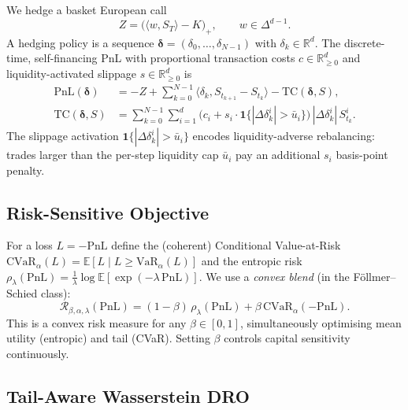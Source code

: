 \documentclass[11pt,a4paper]{article}
\begin{document}
We hedge a basket European call
\begin{equation}
Z = \big(\langle w, S_T \rangle - K\big)_+, \qquad w \in \Delta^{d-1}.
\end{equation}
A hedging policy is a sequence $\boldsymbol{\delta} = (\delta_0, \dots,
\delta_{N-1})$ with $\delta_k \in \mathbb{R}^d$. The discrete-time,
self-financing PnL with proportional transaction costs $c \in \mathbb{R}^d_{\geq 0}$
and liquidity-activated slippage $s \in \mathbb{R}^d_{\geq 0}$ is
\begin{align}
\mathrm{PnL}(\boldsymbol{\delta}) &= -Z + \sum_{k=0}^{N-1} \langle \delta_k,
  S_{t_{k+1}} - S_{t_k}\rangle - \mathrm{TC}(\boldsymbol{\delta}, S),\\
\mathrm{TC}(\boldsymbol{\delta}, S) &= \sum_{k=0}^{N-1}\sum_{i=1}^d \big( c_i + s_i
  \cdot \mathbf{1}\{|\Delta\delta_k^i|>\bar{u}_i\}\big)\, |\Delta\delta_k^i|\, S_{t_k}^i.
\end{align}
The slippage activation $\mathbf{1}\{|\Delta\delta_k^i|>\bar{u}_i\}$ encodes
liquidity-adverse rebalancing: trades larger than the per-step liquidity cap
$\bar{u}_i$ pay an additional $s_i$ basis-point penalty.

\subsection{Risk-Sensitive Objective}

For a loss $L = -\mathrm{PnL}$ define the (coherent) Conditional Value-at-Risk
$\mathrm{CVaR}_\alpha(L) = \mathbb{E}[L \mid L \geq \mathrm{VaR}_\alpha(L)]$ and
the entropic risk
$\rho_\lambda(\mathrm{PnL}) = \frac{1}{\lambda}\log \mathbb{E}[\exp(-\lambda\,
\mathrm{PnL})]$.
We use a \emph{convex blend} (in the F\"ollmer--Schied class):
\begin{equation}
\mathcal{R}_{\beta,\alpha,\lambda}(\mathrm{PnL}) = (1-\beta)\, \rho_\lambda(\mathrm{PnL})
+ \beta\, \mathrm{CVaR}_\alpha(-\mathrm{PnL}).
\label{eq:blend}
\end{equation}
This is a convex risk measure for any $\beta \in [0,1]$, simultaneously
optimising mean utility (entropic) and tail (CVaR). Setting $\beta$ controls
capital sensitivity continuously.

\subsection{Tail-Aware Wasserstein DRO}\label{sec:tail-dro}
\end{document}
